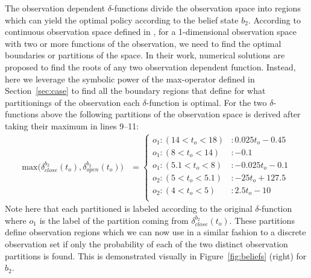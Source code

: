 \documentclass{article} %
\begin{document}

The observation dependent $\delta$-functions divide the observation
space into regions which can yield the optimal policy according to the
belief state $b_2$. According to continuous observation space defined
in \cite{pascal_ijcai05}, for a 1-dimensional observation space with
two or more functions of the observation, we need to find the optimal
boundaries or partitions of the space. In their work, numerical
solutions are proposed to find the roots of any two observation
dependent function. Instead, here we leverage the symbolic power of
the max-operator defined in Section~\ref{sec:case} to find all the
boundary regions that define for what partitionings of the observation
each $\delta$-function is optimal. For the two $\delta$-functions
above the following partitions of the observation space is derived
after taking their maximum in lines 9--11: {\footnotesize
\vspace{-2mm}
\begin{align}
\mathrm{max} \Bigg(\delta_{close}^{b_2}(t_o),\delta_{open}^{b_2}(t_o)\Bigg) &= 
\begin{cases}
o_1: (14 < t_o< 18) &: 0.025 t_o - 0.45\\
o_1: (8 < t_o< 14) &:  -0.1\\
o_1: (5.1 < t_o< 8) &: - 0.025 t_o -0.1\\
o_2: (5 < t_o< 5.1) &: - 25 t_o + 127.5\\
o_2: (4 < t_o< 5) &:  2.5 t_o - 10\\
\end{cases}
\nonumber
\end{align}
}
Note here that each partitioned is labeled according to the original $\delta$-function where $o_1$ is the label of the partition coming from $\delta_{close}^{b_2}(t_o)$. 
These partitions define observation regions which we can now use in a similar fashion to a discrete observation set if only the probability of each of the two distinct observation partitions is found.  This is demonstrated visually
in Figure~\ref{fig:beliefs} (right) for $b_2$. %
\end{document}
